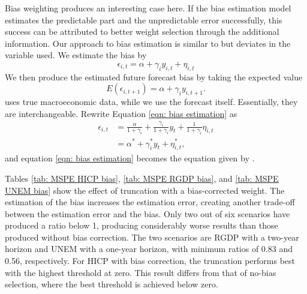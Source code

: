 \documentclass[11pt]{article}
\begin{document}
	Bias weighting produces an interesting case here. If the bias estimation model estimates the predictable part and the unpredictable error successfully, this success can be attributed to better weight selection through the additional information. Our approach to bias estimation is similar to \cite{Gibbs2017} but deviates in the variable used. We estimate the bias by
	\begin{equation}
	\label{eqn: bias estimation}
	\epsilon_{i,t} = \alpha + \gamma_i y_{i,t} + \eta_{i,t}
	\end{equation}
	We then produce the estimated future forecast bias by taking the expected value
	\begin{equation}
	E(\epsilon_{i,t+1}) = \alpha + \gamma_i y_{i,t+1}.
	\end{equation}
	\citeauthor{Gibbs2017} uses true macroeconomic data, while we use the forecast itself. Essentially, they are interchangeable. Rewrite Equation \ref{eqn: bias estimation} as
	\begin{equation}
	\begin{aligned}
	\epsilon_{i,t} &= \frac{\alpha}{1+\gamma_i}+\frac{\gamma_i}{1+\gamma_i}y_t + \frac{1}{1+\gamma_i}\eta_{i,t}\\
	&= \alpha^* + \gamma_i^* y_t + \eta_{i,t}^*,
	\end{aligned} 
	\end{equation}
	and equation \ref{eqn: bias estimation} becomes the equation given by \citeauthor{Gibbs2017}.
	
	Tables \ref{tab: MSPE HICP bias}, \ref{tab: MSPE RGDP bias}, and \ref{tab: MSPE UNEM bias} show the effect of truncation with a bias-corrected weight. The estimation of the bias increases the estimation error, creating another trade-off between the estimation error and the bias. Only two out of six scenarios have produced a ratio below 1, producing considerably worse results than those produced without bias correction. The two scenarios are RGDP with a two-year horizon and UNEM with a one-year horizon, with minimum ratios of 0.83 and 0.56, respectively. For HICP with bias correction, the truncation performs best with the highest threshold at zero. This result differs from that of no-bias selection, where the best threshold is achieved below zero.
	
\end{document}
